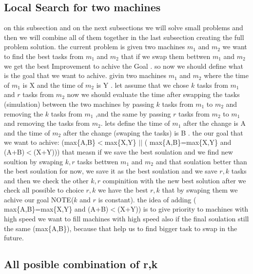 \documentclass[11pt,fullpage]{article}
\begin{document}
\subsection{Local Search for two machines}
on this subsection and on the next subsections we will solve small problems and then we will combine all of them together in the last subsection creating the full problem solution. \newline
the current problem is given two machines $m_1$  and $m_2$ we want to find the best tasks from $m_1$  and $m_2$   that if we
swap them bettwen  $m_1$  and $m_2$  we get the best Improvement to achive the Goal . so now we should define what is the goal that we want to achive.\newline
givin two machines   $m_1$  and $m_2$ where the time of $m_1$ is X and the time of $m_2$ is Y . let assume that we chose $k$ tasks from $m_1$ and $r$ tasks from $m_2$  now we should evaluate the time after swapping the tasks (simulation) between the two machines by passing $k$ tasks from $m_1$ to $m_2$ and removing the $k$ tasks from $m_1$ ,and the same by passing $r$ tasks from $m_2$ to $m_1$ and removing the tasks from $m_2$. lets define the time of $m_1$ after the change is A and the time of $m_2$ after the change (swaping the tasks) is B . the our goal that we want to achive:\newline
 (max\{A,B\}$<$max\{X,Y\} $ ||$ ( max\{A,B\}=max\{X,Y\}  and (A+B)$<$(X+Y))) \newline
that measn if we save the best soulation and we find new soultion by swaping $k , r$ tasks bettwen $m_1$ and $m_2$ and that soulation  better than the best soulation for now, we save it as the best soulation and we save $r, k$ tasks and then we check the other $k, r$ compinition with the
new best solution after we check all possible to choice  $r, k$ we have the best $r,k$ that by swaping them we achive our goal NOTE($k $ and $ r$ is constant).\newline
the idea of adding ( max\{A,B\}=max\{X,Y\}  and (A+B)$<$(X+Y)) is to give priority to machines with high speed we want to fill machines with high speed also 
if the final soulation still the same (max\{A,B\}), because that help us to find bigger task to swap in the future.
\subsection{All posible combination of r,k}


 

\end{document}
